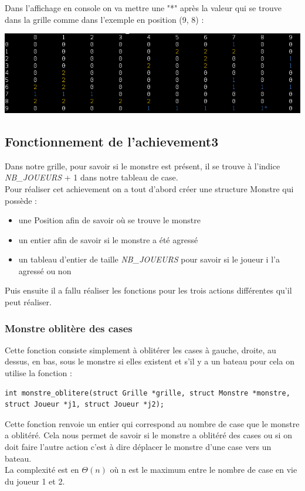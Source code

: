 \newpage
Dans l'affichage en console on va mettre une "*" après la valeur qui se trouve dans la grille comme dans l'exemple en position (9, 8) : \\
\begin{center}
  \includegraphics[scale=0.8]{./image/Godzilla_console.png}
\end{center}
\subsection{Fonctionnement de l'achievement3}
Dans notre grille, pour savoir si le monstre est présent, il se trouve à l'indice {\textit{NB\_JOUEURS}} + 1 dans notre tableau de case.\\
Pour réaliser cet achievement on a tout d'abord créer une structure Monstre qui possède :
\begin{itemize}
\item une Position afin de savoir où se trouve le monstre
\item un entier afin de savoir si le monstre a été agressé
\item un tableau d'entier de taille {\textit{NB\_JOUEURS}} pour savoir si le joueur i l'a agressé ou non
\end{itemize}
Puis ensuite il a fallu réaliser les fonctions pour les trois actions différentes qu'il peut réaliser.
\subsubsection{Monstre oblitère des cases}
Cette fonction consiste simplement à oblitérer les cases à gauche, droite, au dessus, en bas, sous le monstre si elles existent et s'il y a un bateau pour cela on utilise la fonction :
\begin{lstlisting}
int monstre_oblitere(struct Grille *grille, struct Monstre *monstre, struct Joueur *j1, struct Joueur *j2);
\end{lstlisting}
Cette fonction renvoie un entier qui correspond au nombre de case que le monstre a oblitéré. Cela nous permet de savoir si le monstre a oblitéré des cases ou si on doit faire l'autre action c'est à dire déplacer le monstre d'une case vers un bateau.\\
La complexité est en $\Theta(n)$ où n est le maximum entre le nombre de case en vie du joueur 1 et 2.
